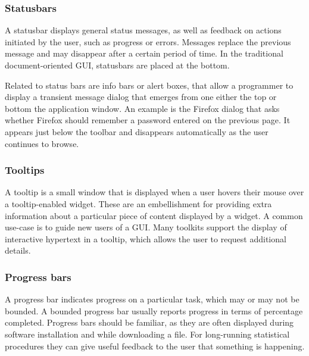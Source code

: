 \subsubsection{Statusbars}
\label{sec:GUI:statusbars}

A statusbar displays general status messages, as well as feedback on
actions initiated by the user, such as progress or errors. Messages
replace the previous message and may disappear after a certain period
of time. In the traditional document-oriented GUI, statusbars are
placed at the bottom.

Related to status bars are info bars or alert boxes, that allow a
programmer to display a transient message dialog that emerges from one
either the top or bottom the application window. An example is the
Firefox dialog that asks whether Firefox should remember a
password entered on the previous page. It appears just below the
toolbar and disappears automatically as the user continues to browse.

\subsubsection{Tooltips}
\label{sec:GUI:basic-tooltips}

A tooltip is a small window that is displayed when a user hovers their
mouse over a tooltip-enabled widget. These are an embellishment for
providing extra information about a particular piece of content
displayed by a widget. A common use-case is to guide new users of a
GUI. Many toolkits support the display of interactive hypertext in a
tooltip, which allows the user to request additional details.

\subsubsection{Progress bars}

A progress bar indicates progress on a particular task, which may or
may not be bounded. A bounded progress bar usually reports progress in
terms of percentage completed. Progress bars should be familiar, as
they are often displayed during software installation and while
downloading a file. For long-running statistical procedures they can
give useful feedback to the user that something is happening.


